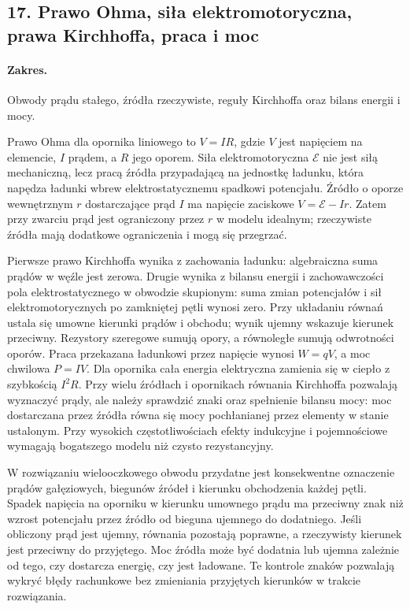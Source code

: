 \documentclass[11pt,a4paper]{article}
\begin{document}
\subsection{17. Prawo Ohma, siła elektromotoryczna, prawa Kirchhoffa, praca i moc}
\paragraph{Zakres.} Obwody prądu stałego, źródła rzeczywiste, reguły Kirchhoffa oraz bilans energii i mocy.

Prawo Ohma dla opornika liniowego to $V=IR$, gdzie $V$ jest napięciem na elemencie, $I$ prądem, a $R$ jego oporem. Siła elektromotoryczna $\mathcal E$ nie jest siłą mechaniczną, lecz pracą źródła przypadającą na jednostkę ładunku, która napędza ładunki wbrew elektrostatycznemu spadkowi potencjału. Źródło o oporze wewnętrznym $r$ dostarczające prąd $I$ ma napięcie zaciskowe $V=\mathcal E-Ir$. Zatem przy zwarciu prąd jest ograniczony przez $r$ w modelu idealnym; rzeczywiste źródła mają dodatkowe ograniczenia i mogą się przegrzać.

Pierwsze prawo Kirchhoffa wynika z zachowania ładunku: algebraiczna suma prądów w węźle jest zerowa. Drugie wynika z bilansu energii i zachowawczości pola elektrostatycznego w obwodzie skupionym: suma zmian potencjałów i sił elektromotorycznych po zamkniętej pętli wynosi zero. Przy układaniu równań ustala się umowne kierunki prądów i obchodu; wynik ujemny wskazuje kierunek przeciwny. Rezystory szeregowe sumują opory, a równoległe sumują odwrotności oporów. Praca przekazana ładunkowi przez napięcie wynosi $W=qV$, a moc chwilowa $P=IV$. Dla opornika cała energia elektryczna zamienia się w ciepło z szybkością $I^2R$. Przy wielu źródłach i opornikach równania Kirchhoffa pozwalają wyznaczyć prądy, ale należy sprawdzić znaki oraz spełnienie bilansu mocy: moc dostarczana przez źródła równa się mocy pochłanianej przez elementy w stanie ustalonym. Przy wysokich częstotliwościach efekty indukcyjne i pojemnościowe wymagają bogatszego modelu niż czysto rezystancyjny.

W rozwiązaniu wielooczkowego obwodu przydatne jest konsekwentne oznaczenie prądów gałęziowych, biegunów źródeł i kierunku obchodzenia każdej pętli. Spadek napięcia na oporniku w kierunku umownego prądu ma przeciwny znak niż wzrost potencjału przez źródło od bieguna ujemnego do dodatniego. Jeśli obliczony prąd jest ujemny, równania pozostają poprawne, a rzeczywisty kierunek jest przeciwny do przyjętego. Moc źródła może być dodatnia lub ujemna zależnie od tego, czy dostarcza energię, czy jest ładowane. Te kontrole znaków pozwalają wykryć błędy rachunkowe bez zmieniania przyjętych kierunków w trakcie rozwiązania.
\end{document}
